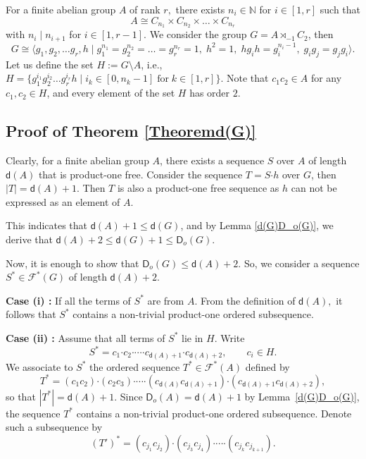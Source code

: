 \documentclass[a4paper,11pt]{article}
\numberwithin{equation}{section}
\newcommand{\bdot}{\boldsymbol{\cdot}}
\newcommand{\no}{\noindent}
\begin{document}
For a finite abelian group $A$ of rank $r,$ there exists $n_i\in \mathbb{N}$ for $i\in [1,r]$ such that
$$A \cong C_{n_1}\times C_{n_2}\times \dotsc \times C_{n_r}$$ with $n_i \mid n_{i+1}$ for $i\in [1,r-1].$ We consider the group $G=A \rtimes_{-1} C_2$, then
$$G \cong \langle g_1,g_2,\dotsc g_r,h \mid g_1^{n_1}=g_2^{n_2}=\dotsc =g_{r}^{n_r}=1, \; h^2=1, \; hg_ih=g_i^{n_i-1}, \; g_ig_j=g_jg_i \rangle.$$
Let us define the set $H:=G \setminus A$, i.e., $H=\{g_1^{i_1}g_2^{i_2}\dotsc g_r^{i_r}h \mid i_k \in [0, n_k-1] \; \text{for} \; k \in [1,r]\}$. Note that $c_1c_2 \in A$ for any $c_1, c_2 \in H$, and every element of the set $H$ has order $2$.

\subsection*{Proof of Theorem \ref{Theoremd(G)}}

Clearly, for a finite abelian group $A$, there exists a sequence $S$ over $A$ of length $\mathsf{d}(A)$ that is product-one free. Consider the sequence $T=S\bdot h$ over $G$, then $ |T|=\mathsf{d}(A)+1$. Then $T$ is also a product-one free sequence as $h$ can not be expressed as an element of $A.$

This indicates that $\mathsf{d}(A)+1 \le \mathsf{d}(G)$, and by Lemma \ref{d(G)D_o(G)}, we derive that $\mathsf{d}(A)+2 \le \mathsf{d}(G)+1 \le \mathsf{D}_o(G)$. 


\no Now, it is enough to show that $\mathsf{D}_o(G) \le \mathsf{d}(A)+2.$ So, we consider a sequence $S^{\ast} \in \mathcal{F}^{\ast}(G)$ of length $\mathsf{d}(A)+2$. 

\no \textbf{Case (i) :} If all the terms of $S^{\ast}$ are from $A$. From the definition of $\mathsf{d}(A),$ it follows that $S^{\ast}$ contains a non-trivial product-one ordered subsequence.

\no \textbf{Case (ii) :} Assume that all terms of $S^{\ast}$ lie in $H$. Write 
\[
S^{\ast}
= c_1 \bdot c_2 \bdot \dotsb \bdot c_{\mathsf{d}(A)+1} \bdot c_{\mathsf{d}(A)+2},
\qquad c_i \in H.
\]
We associate to $S^{\ast}$ the ordered sequence $T^{\ast} \in \mathcal{F}^{\ast}(A)$ defined by 
\[
T^{\ast}
= (c_1c_2) \bdot (c_2c_3) \bdot \dotsb \bdot (c_{\mathsf{d}(A)}c_{\mathsf{d}(A)+1}) 
 \bdot (c_{\mathsf{d}(A)+1}c_{\mathsf{d}(A)+2}),
\]
so that $|T^{\ast}|=\mathsf{d}(A)+1$. Since $\mathsf{D}_o(A)=\mathsf{d}(A)+1$ by Lemma~\ref{d(G)D_o(G)}, the sequence $T^{\ast}$ contains a non-trivial product-one ordered subsequence. Denote such a subsequence by
\[
(T')^{\ast}
= (c_{j_1}c_{j_2}) \bdot (c_{j_3}c_{j_4}) \bdot \dotsb \bdot (c_{j_k}c_{j_{k+1}}).
\]
\end{document}
